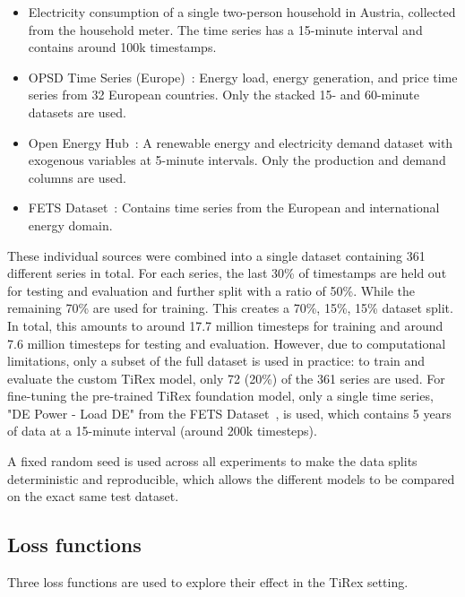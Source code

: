 \documentclass[a4paper,oneside,10pt,ngerman,english]{scrartcl}
\begin{document}
\begin{itemize}[]
	\item Electricity consumption of a single two-person household in Austria, collected from the household meter. The time series has a 15-minute interval and contains around 100k timestamps.
	\item OPSD Time Series (Europe)~\cite{opsd}: Energy load, energy generation, and price time series from 32 European countries. Only the stacked 15- and 60-minute datasets are used.
	\item Open Energy Hub~\cite{openenergyhub}: A renewable energy and electricity demand dataset with exogenous variables at 5-minute intervals. Only the production and demand columns are used.
	\item FETS Dataset~\cite{obermeier_2026_19418721}: Contains time series from the European and international energy domain.
\end{itemize}

These individual sources were combined into a single dataset containing 361 different series in total. For each series, the last 30\% of timestamps are held out for testing and evaluation and further split with a ratio of 50\%. While the remaining 70\% are used for training. This creates a 70\%, 15\%, 15\% dataset split. In total, this amounts to around 17.7 million timesteps for training and around 7.6 million timesteps for testing and evaluation. However, due to computational limitations, only a subset of the full dataset is used in practice: to train and evaluate the custom TiRex model, only 72 (20\%) of the 361 series are used. For fine-tuning the pre-trained TiRex foundation model, only a single time series, "DE Power - Load DE" from the FETS Dataset~\cite{obermeier_2026_19418721}, is used, which contains 5 years of data at a 15-minute interval (around 200k timesteps).

A fixed random seed is used across all experiments to make the data splits deterministic and reproducible, which allows the different models to be compared on the exact same test dataset.

\subsection{Loss functions}
\label{sec:loss}

Three loss functions are used to explore their effect in the TiRex setting.
 
\end{document}
